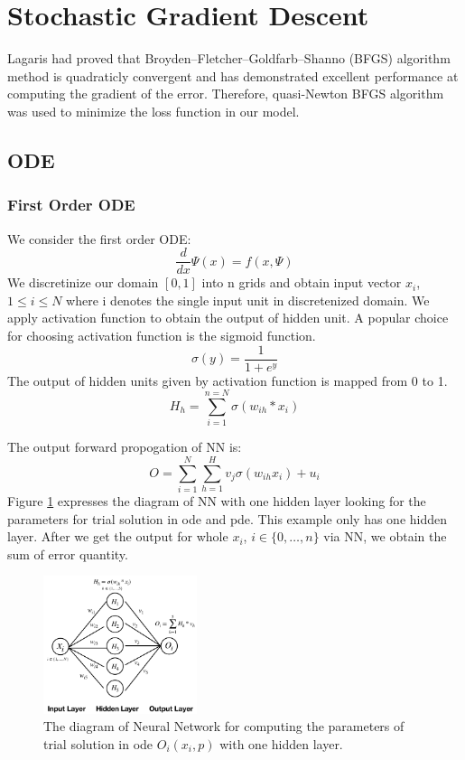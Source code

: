 \documentclass{article}
\begin{document}
\section{Stochastic Gradient Descent}
Lagaris\cite{lagaris} had proved that Broyden–Fletcher–Goldfarb–Shanno (BFGS) algorithm method is quadraticly convergent and has demonstrated excellent performance at computing the gradient of the error. 
Therefore, quasi-Newton BFGS algorithm was used to minimize the loss function in our model.



\subsection{ODE}
\subsubsection{First Order ODE}
We consider the first order ODE:
\[\frac{d}{dx}\Psi(x)=f(x,\Psi)\]
We discretinize our domain $[0,1]$ into n grids and obtain input vector $x_i$, $1 \leq i \leq N$ where i denotes the single input unit in discretenized domain.
We apply activation function to obtain the output of hidden unit. A popular choice for choosing activation function is the sigmoid function. 
\begin{equation}\label{eq:sigmoid}
\sigma(y) = \frac{1}{1+e^{y}} 
\end{equation}
The output of hidden units given by activation function is mapped from 0 to 1.
\begin{equation}\label{eq:hidden_unit}
H_{h} = \sum_{i=1}^{n=N} \sigma (w_{ih}*x_i)
\end{equation}

\medspace \noindent
The output forward propogation of NN is:
\begin{equation}\label{eq:output_ode}
O = \sum_{i=1}^{N} \sum_{h=1}^{H} \textit{v}_{j}\sigma (w_{ih}x_{i}) + u_i
\end{equation}
\medspace \noindent
Figure \ref{fig:nn_struct} expresses the diagram of NN with one hidden layer looking for the parameters for trial solution in ode and pde. This example only has one hidden layer. After we get the output for whole $x_{i}$, $i \in \{0, \dots , n\}$ via NN, we obtain the sum of error quantity. 

\begin{figure}
	\centering
	\includegraphics[width=0.4\textwidth]{nn_struct.png}
	\caption{The diagram of Neural Network for computing the parameters of trial solution in ode $O_{i}(x_i,p)$ with one hidden layer. }
	\label{fig:nn_struct}
\end{figure}
\end{document}
